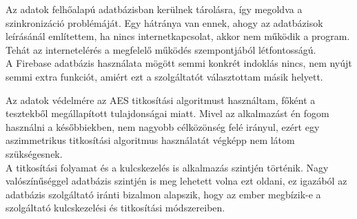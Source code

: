 		







Az adatok felhőalapú adatbázisban kerülnek tárolásra, így megoldva a szinkronizáció problémáját. Egy hátránya van ennek, ahogy az adatbázisok leírásánál említettem, ha nincs internetkapcsolat, akkor nem működik a program. Tehát az internetelérés a megfelelő működés szempontjából létfontosságú.
\vspace{5pt} \\A Firebase adatbázis használata mögött semmi konkrét indoklás nincs, nem nyújt semmi extra funkciót, amiért ezt a szolgáltatót választottam másik helyett.


Az adatok védelmére az AES titkosítási algoritmust használtam, főként a tesztekből megállapított tulajdonságai miatt. Mivel az alkalmazást én fogom használni a későbbiekben, nem nagyobb célközönség felé irányul, ezért egy aszimmetrikus titkosítási algoritmus használatát végképp nem látom szükségesnek.
\\A titkosítási folyamat és a kulcskezelés is alkalmazás szintjén történik. Nagy valószínűséggel adatbázis szintjén is meg lehetett volna ezt oldani, ez igazából az adatbázis szolgáltató iránti bizalmon alapszik, hogy az ember megbízik-e a szolgáltató kulcskezelési és titkosítási módszereiben.


